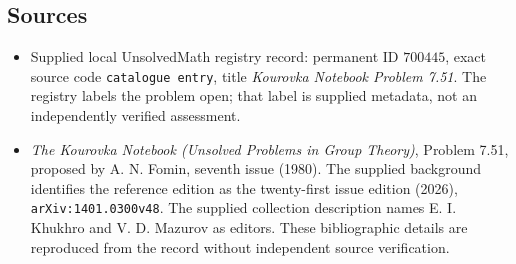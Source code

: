 \documentclass[11pt]{article}
\begin{document}
\subsection{Sources}
\begin{itemize}
\item Supplied local UnsolvedMath registry record: permanent ID \(700445\), exact source code \texttt{catalogue entry}, title \emph{Kourovka Notebook Problem 7.51}. The registry labels the problem open; that label is supplied metadata, not an independently verified assessment.
\item \emph{The Kourovka Notebook (Unsolved Problems in Group Theory)}, Problem 7.51, proposed by A. N. Fomin, seventh issue (1980). The supplied background identifies the reference edition as the twenty-first issue edition (2026), \texttt{arXiv:1401.0300v48}. The supplied collection description names E. I. Khukhro and V. D. Mazurov as editors. These bibliographic details are reproduced from the record without independent source verification.
\end{itemize}
\end{document}
